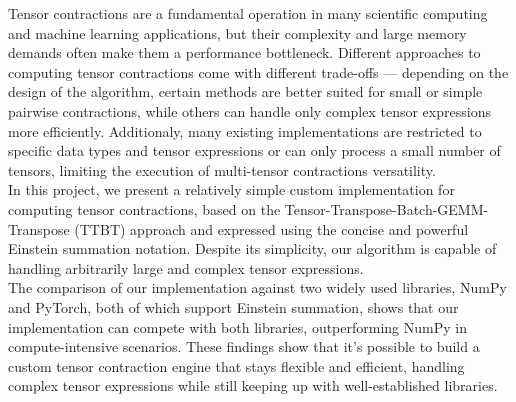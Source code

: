 Tensor contractions are a fundamental operation in many scientific computing and machine learning applications, but their complexity and large memory demands often make them a performance bottleneck.
Different approaches to computing tensor contractions come with different trade-offs — depending on the design of the algorithm, certain methods are better suited for small or simple pairwise contractions, while others can handle only complex tensor expressions more efficiently.
Additionaly, many existing implementations are restricted to specific data types and tensor expressions or  can only process a small number of tensors, limiting the execution of multi-tensor contractions versatility.\\
In this project, we present a relatively simple custom implementation for computing tensor contractions, based on the Tensor-Transpose-Batch-GEMM-Transpose (TTBT) approach and expressed using the concise and powerful Einstein summation notation. Despite its simplicity, our algorithm is capable of handling arbitrarily large and complex tensor expressions.\\
The comparison of our implementation against two widely used libraries, NumPy and PyTorch, both of which support Einstein summation, shows that our implementation can compete with both libraries, outperforming NumPy in compute-intensive scenarios. These findings show that it’s possible to build a custom tensor contraction engine that stays flexible and efficient, handling complex tensor expressions while still keeping up with well-established libraries.
